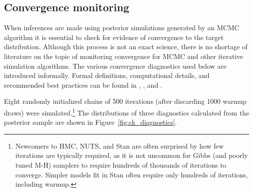 \subsection{Convergence monitoring}
\label{subsection_convergence}



When inferences are made using posterior simulations generated by an MCMC algorithm it is essential to check for evidence of convergence to the target distribution. Although this process is not an exact science, there is no shortage of literature on the topic of monitoring convergence for MCMC and other iterative simulation algorithms. The various convergence diagnostics used below are introduced informally. Formal definitions, computational details, and recommended best practices can be found in , , and .

Eight randomly initialized chains of 500 iterations (after discarding 1000 warmup draws) were simulated.\footnote{Newcomers to HMC, NUTS, and Stan are often surprised by how few iterations are typically required, as it is not uncommon for Gibbs (and poorly tuned M-H) samplers to require hundreds of thousands of iterations to converge. Simpler models fit in Stan often require only hundreds of iterations, including warmup.} The distributions of three diagnostics calculated from the posterior sample are shown in Figure~\ref{fig:ck_diagnostics}. 

